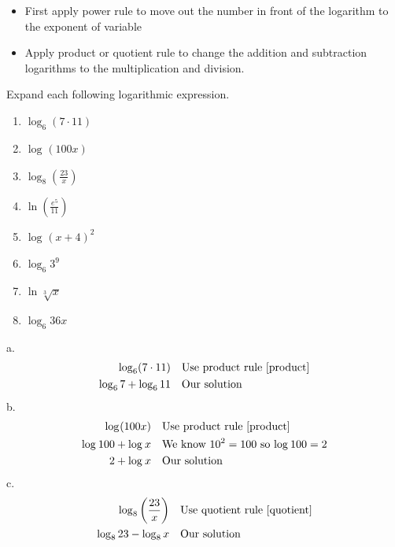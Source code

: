     	\begin{itemize}
		\item First apply power rule to move out the number in front of the
			  logarithm to the exponent of variable
		\item Apply product or quotient rule to change the addition and subtraction
			  logarithms to the multiplication and division.
		\end{itemize}
\begin{exa}
	Expand each following logarithmic expression.
	\begin{multicols}{2}
	\begin{enumerate}[\bfseries a.]
	    \item $\log_{6}(7\cdot11)$
	    \item $\log_{}(100x)$
	    \item $\log_{8}\left(\frac{23}{x}\right)$
	    \item $\ln{\left(\frac{e^5}{11}\right)}$
	    \item $\log_{}(x+4)^2 $
	    \item $\log_{6}3^9 $
	    \item $\ln{\sqrt[3]{x}} $
	    \item $\log_{6}{36x} $
	\end{enumerate}
	\end{multicols}
\end{exa}
%
a.	\begin{align*}
		\log_{6}(7\cdot11)&         &       &\text{Use product rule \eqref{product}}\\
		\log_{6}7+\log_{6}11&       &       &\text{Our solution}\\
    \end{align*}
%
b.    \begin{align*}
		\log_{}(100x)&	            &       &\text{Use product rule \eqref{product}}\\
		\log_{}100+\log_{}x&	    &       &\text{We know $10^2=100$ so $\log_{}100=2$}\\
		2+\log_{}x&	                &      &\text{Our solution}\\
     \end{align*}
%
c.    \begin{align*}
		\log_{8}\left(\frac{23}{x}\right)&	&   &\text{Use quotient rule \eqref{quotient}}\\
		\log_{8}23-\log_{8}x&	            &   &\text{Our solution}\\
     \end{align*}
